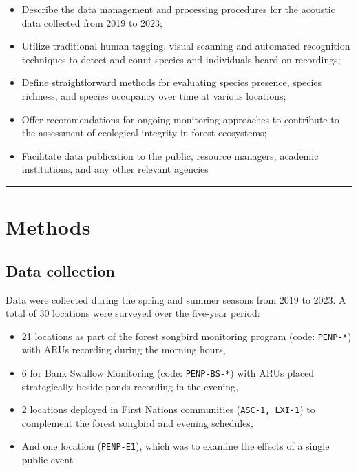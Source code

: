 \documentclass[
  letterpaper,
  DIV=11,
  numbers=noendperiod,
  oneside]{scrartcl}
\providecommand{\tightlist}{%
  \setlength{\itemsep}{0pt}\setlength{\parskip}{0pt}}\usepackage{longtable,booktabs,array}
\begin{document}
\begin{itemize}
\tightlist
\item
  Describe the data management and processing procedures for the
  acoustic data collected from 2019 to 2023;
\item
  Utilize traditional human tagging, visual scanning and automated
  recognition techniques to detect and count species and individuals
  heard on recordings;
\item
  Define straightforward methods for evaluating species presence,
  species richness, and species occupancy over time at various
  locations;
\item
  Offer recommendations for ongoing monitoring approaches to contribute
  to the assessment of ecological integrity in forest ecosystems;
\item
  Facilitate data publication to the public, resource managers, academic
  institutions, and any other relevant agencies
\end{itemize}

\begin{center}\rule{0.5\linewidth}{0.5pt}\end{center}

\hypertarget{methods}{%
\section{Methods}\label{methods}}

\hypertarget{data-collection}{%
\subsection{Data collection}\label{data-collection}}

Data were collected during the spring and summer seasons from 2019 to
2023. A total of 30 locations were surveyed over the five-year period:

\begin{itemize}
\tightlist
\item
  21 locations as part of the forest songbird monitoring program (code:
  \texttt{PENP-*}) with ARUs recording during the morning hours,
\item
  6 for Bank Swallow Monitoring (code: \texttt{PENP-BS-*}) with ARUs
  placed strategically beside ponds recording in the evening,
\item
  2 locations deployed in First Nations communities
  (\texttt{ASC-1,\ LXI-1}) to complement the forest songbird and evening
  schedules,
\item
  And one location (\texttt{PENP-E1}), which was to examine the effects
  of a single public event
\end{itemize}
\end{document}
